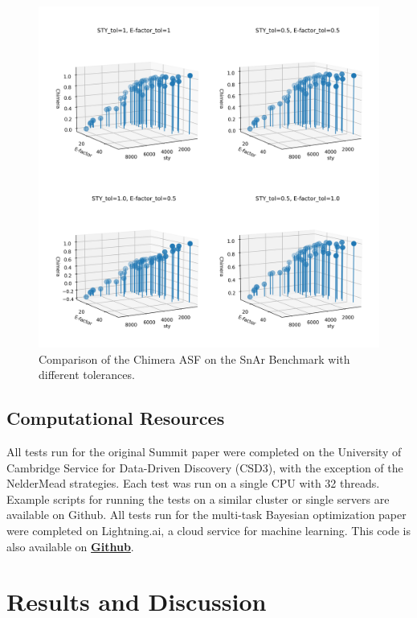 \begin{figure}
    \includegraphics[width=\textwidth]{gfx/Chapter03/chimera_comparison.png}
    \caption{Comparison of the Chimera ASF on the SnAr Benchmark with different tolerances.}
    \label{fig:chimera_comparsion}
\end{figure}

\subsection{Computational Resources}
All tests run for the original Summit paper were completed on the University of Cambridge Service for Data-Driven Discovery (CSD3), with the exception of the NelderMead strategies. Each test was run on a single CPU with 32 threads. Example scripts for running the tests on a similar cluster or single servers are available on Github. All tests run for the multi-task Bayesian optimization paper were completed on Lightning.ai, a cloud service for machine learning. This code is also available on \textbf{\href{https://github.com/sustainable-processes/multitask}{Github}}.


\section{Results and Discussion}

